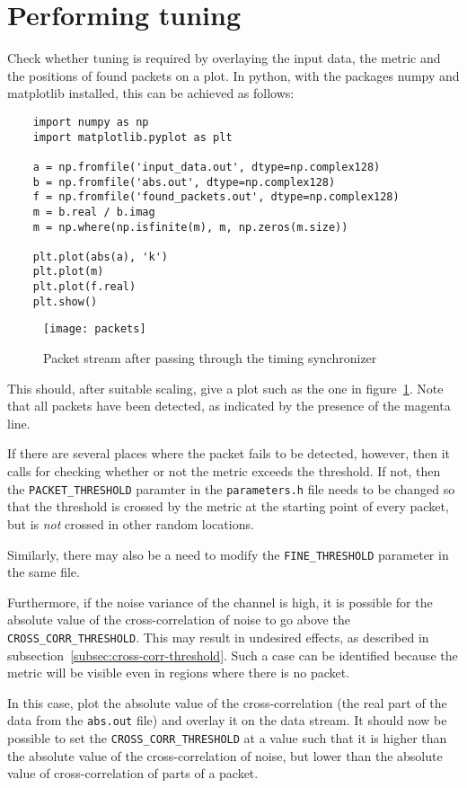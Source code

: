 
\section{Performing tuning}

Check whether tuning is required by overlaying the input data, the metric and
the positions of found packets on a plot. In python, with the packages numpy
and matplotlib installed, this can be achieved as follows:

\lstset{language=Python}
\begin{lstlisting}
	import numpy as np
	import matplotlib.pyplot as plt

	a = np.fromfile('input_data.out', dtype=np.complex128)
	b = np.fromfile('abs.out', dtype=np.complex128)
	f = np.fromfile('found_packets.out', dtype=np.complex128)
	m = b.real / b.imag
	m = np.where(np.isfinite(m), m, np.zeros(m.size))
	
	plt.plot(abs(a), 'k')
	plt.plot(m)
	plt.plot(f.real)
	plt.show()
\end{lstlisting}
\lstset{language=C++}

\begin{figure}[h]
	\centering
	\texttt{[image: packets]}
	\caption{Packet stream after passing through the timing synchronizer}
	\label{fig:packets}
\end{figure}

This should, after suitable scaling, give a plot such as the one in
figure~\ref{fig:packets}. Note that all packets have been detected, as
indicated by the presence of the magenta line.

If there are several places where the packet fails to be detected, however,
then it calls for checking whether or not the metric exceeds the threshold. If
not, then the \lstinline!PACKET_THRESHOLD! paramter in the
\texttt{parameters.h} file needs to be changed so that the threshold is crossed
by the metric at the starting point of every packet, but is \emph{not} crossed
in other random locations.

Similarly, there may also be a need to modify the \lstinline!FINE_THRESHOLD!
parameter in the same file.

Furthermore, if the noise variance of the channel is high, it is possible for
the absolute value of the cross-correlation of noise to go above the
\lstinline!CROSS_CORR_THRESHOLD!. This may result in undesired effects, as
described in subsection~\ref{subsec:cross-corr-threshold}. Such a case can be
identified because the metric will be visible even in regions where there is no
packet.

In this case, plot the absolute value of the cross-correlation (the real part
of the data from the \texttt{abs.out} file) and overlay it on the data stream.
It should now be possible to set the \lstinline!CROSS_CORR_THRESHOLD! at a
value such that it is higher than the absolute value of the cross-correlation
of noise, but lower than the absolute value of cross-correlation of parts of a
packet.
